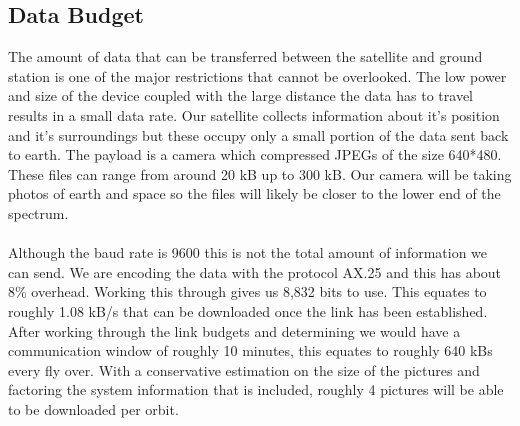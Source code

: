 \subsection{Data Budget}
The amount of data that can be transferred between the satellite and ground station is one of the major restrictions that cannot be overlooked. The low power and size of the device coupled with the large distance the data has to travel results in a small data rate. Our satellite collects information about it's position and it's surroundings  but these occupy only a small portion of the data sent back to earth. The payload is a camera which compressed JPEGs of the size 640*480. These files can range from around 20 kB up to 300 kB. Our camera will be taking photos of earth and space so the files will likely be closer to the lower end of the spectrum. \\
\\ \noindent
Although the baud rate is 9600 this is not the total amount of information we can send. We are encoding the data with the protocol AX.25 and this has about 8\% overhead. Working this through gives us 8,832 bits to use. This equates to roughly 1.08 kB/s that can be downloaded once the link has been established. After working through the link budgets and determining we would have a communication window of roughly 10 minutes, this equates to roughly 640 kBs every fly over. With a conservative estimation on the size of the pictures and factoring the system information that is included, roughly 4 pictures will be able to be downloaded per orbit.


